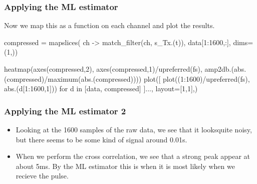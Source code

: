 \documentclass[compress]{beamer}
\begin{document}
\begin{frame}[fragile] %
    \frametitle{Applying the ML estimator}
    Now we map this as a function on each channel and plot the results.
    \begin{jllisting}[gobble=8]
        compressed = mapslices(
            ch -> match_filter(ch, s_Tx.(t)),
            data[1:1600,:], dims=(1,)) 

        heatmap(axes(compressed,2), axes(compressed,1)/upreferred(fs), 
            amp2db.(abs.(compressed)/maximum(abs.(compressed))))
        plot([
            plot((1:1600)/upreferred(fs), abs.(d[1:1600,1]))
            for d in [data, compressed]
        ]..., layout=[1,1],)
    \end{jllisting}
    \begin{figure}
        \centering
        \begin{subfigure}{0.5\textwidth}
            \centering
            
        \end{subfigure}%
        \begin{subfigure}{0.5\textwidth}
            \centering
            
        \end{subfigure}
    \end{figure}
\end{frame}

\begin{frame} %
    \frametitle{Applying the ML estimator 2}
    \begin{itemize}
        \item Looking at the 1600 samples of the raw data, we see that it looksquite noisy,
            but there seems to be some kind of signal around 0.01s. 

        \item When we perform the cross correlation, we see that a strong peak appear at
            about 5ms. By the ML estimator this is when it is most likely when we
            recieve the pulse.
    \end{itemize}
    \begin{figure}
        \centering
        \begin{subfigure}{0.5\textwidth}
            \centering
            
        \end{subfigure}%
        \begin{subfigure}{0.5\textwidth}
            \centering
            
        \end{subfigure}
    \end{figure}
\end{frame} %
\end{document}
